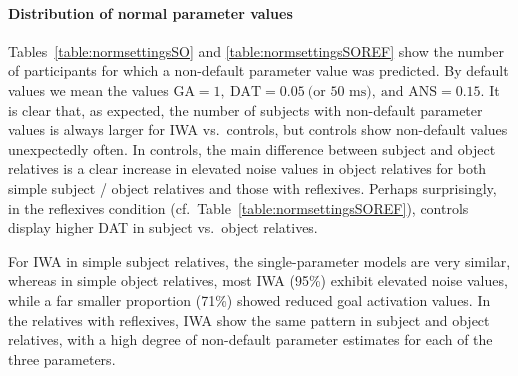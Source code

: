\documentclass[10pt,letterpaper]{article}
\begin{document}
%
%

\paragraph{Distribution of normal parameter values} 
Tables~\ref{table:normsettingsSO} and \ref{table:normsettingsSOREF} show the number of participants for which a non-default parameter value was predicted. 
By default values we mean the values $\text{GA} = 1,\ \text{DAT} = 0.05\ \text{(or 50 ms)},\ \text{and ANS} = 0.15$.
It is 
clear that, as expected, the number of subjects with non-default parameter values is always larger for IWA vs.\ controls, but controls show non-default values unexpectedly often.
In controls, the main difference between subject and object relatives is a clear increase in elevated noise values in object relatives for both simple subject / object relatives and those with reflexives. Perhaps surprisingly, in the reflexives condition (cf.\ Table~\ref{table:normsettingsSOREF}), controls display higher DAT in subject vs.\ object relatives.

For IWA in simple subject relatives, the single-parameter models are very similar, whereas in simple object relatives, most IWA (95\%) exhibit elevated noise values, while a far smaller proportion (71\%) showed reduced goal activation values. In the relatives with reflexives, IWA show the same pattern in subject and object relatives, with a high degree of non-default parameter estimates for each of the three parameters.
\end{document}
